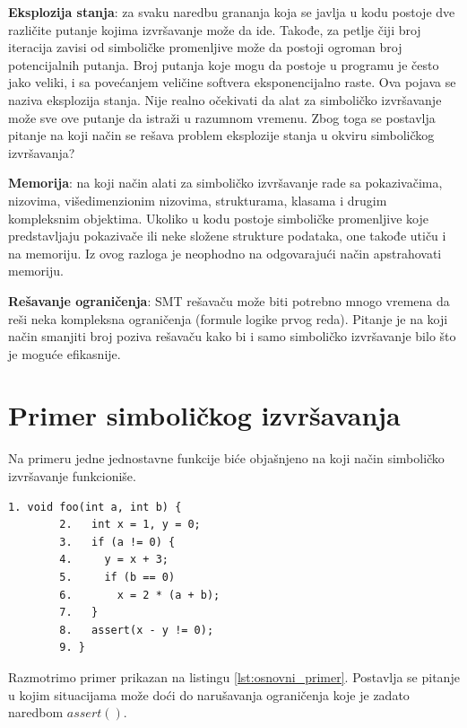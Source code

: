 \documentclass[12pt,oneside]{memoir}
\begin{document}
\begin{description}
    \item \textbf{Eksplozija stanja}: za svaku naredbu grananja koja se javlja u kodu postoje dve različite putanje kojima izvršavanje može da ide. Takođe, za petlje čiji broj iteracija zavisi od simboličke promenljive može da postoji ogroman broj potencijalnih putanja. Broj putanja koje mogu da postoje u programu je često jako veliki, i sa povećanjem veličine softvera eksponencijalno raste. Ova pojava se naziva eksplozija stanja. Nije realno očekivati da alat za simboličko izvršavanje može sve ove putanje da istraži u razumnom vremenu. Zbog toga se postavlja pitanje na koji način se rešava problem eksplozije stanja u okviru simboličkog izvršavanja?
    
    \item \textbf{Memorija}: na koji način alati za simboličko izvršavanje rade sa pokazivačima, nizovima, višedimenzionim nizovima, strukturama, klasama i drugim kompleksnim objektima. Ukoliko u kodu postoje simboličke promenljive koje predstavljaju pokazivače ili neke složene strukture podataka, one takođe utiču i na memoriju. Iz ovog razloga je neophodno na odgovarajući način apstrahovati memoriju.

    \item \textbf{Rešavanje ograničenja}: SMT rešavaču može biti potrebno mnogo vremena da reši neka kompleksna ograničenja (formule logike prvog reda). Pitanje je na koji način smanjiti broj poziva rešavaču kako bi i samo simboličko izvršavanje bilo što je moguće efikasnije.
    
\end{description}

\section{Primer simboličkog izvršavanja}
Na primeru jedne jednostavne funkcije biće objašnjeno na koji način simboličko izvršavanje funkcioniše.

    \begin{lstlisting}[caption={Osnovni primer simboličkog izvršavanja},captionpos=b,label={lst:osnovni_primer}]
        1. void foo(int a, int b) {
        2.   int x = 1, y = 0;
        3.   if (a != 0) {
        4.     y = x + 3;
        5.     if (b == 0)
        6.       x = 2 * (a + b);
        7.   }
        8.   assert(x - y != 0);
        9. }
    \end{lstlisting}

\noindent Razmotrimo primer prikazan na listingu \ref{lst:osnovni_primer}. Postavlja se pitanje u kojim situacijama može doći do narušavanja ograničenja koje je zadato naredbom $assert()$. 
\end{document}
